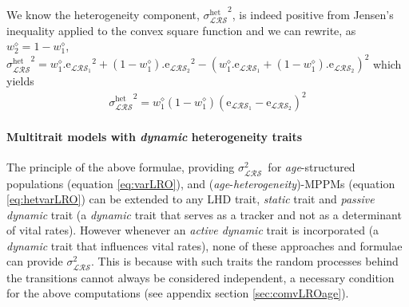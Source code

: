 \documentclass[10pt,a4paper]{article}
\newcommand{\vLRO}{$\sigma_{\mathrm{\mathcal{LRS}}}^2$}
\begin{document}
We know the heterogeneity component, ${\sigma_{\mathcal{LRS}}^{\mathrm{het}}}^{2}$, is indeed positive from Jensen's inequality applied to the convex square function and  we can rewrite, as $w^{\diamond}_{2}=1-w^{\diamond}_{1}$, 
$
{\sigma_{\mathcal{LRS}}^{\mathrm{het}}}^{2}= w^{\diamond}_{1}.\mathrm{e_{\mathcal{LRS}_1}}^2+(1-w^{\diamond}_{1}).\mathrm{e_{\mathcal{LRS}_2}}^2-(w^{\diamond}_{1}.\mathrm{e_{\mathcal{LRS}_1}}+(1-w^{\diamond}_{1}).\mathrm{e_{\mathcal{LRS}_2}})^2
$
which yields
\begin{eqnarray}
{\sigma_{\mathcal{LRS}}^{\mathrm{het}}}^{2}= w^{\diamond}_{1}(1-w^{\diamond}_{1})(\mathrm{e_{\mathcal{LRS}_1}}-\mathrm{e_{\mathcal{LRS}_2}})^2
\label{eq:hetvarLRO2}
 \end{eqnarray}

\paragraph{Multitrait models with \emph{dynamic} heterogeneity traits} 
\label{sec:vlrodynhet}
\label{sec:MCwR}

The principle of the above formulae, providing \vLRO\ for \emph{age}-structured populations  (equation \ref{eq:varLRO}), and (\emph{age}-\emph{heterogeneity})-MPPMs (equation \ref{eq:hetvarLRO}) can be extended to any LHD trait, \emph{static} trait and \emph{passive} \emph{dynamic}  trait (a \emph{dynamic} trait that serves as a tracker and not as a determinant of vital rates).%
However whenever an \emph{active dynamic} trait is incorporated (a \emph{dynamic} trait that influences vital rates), none of these approaches and formulae can provide \vLRO. This is because with such traits the random processes behind the transitions cannot always be considered independent, a necessary condition for the above computations (see appendix section \ref{sec:comvLROage}).\\
  
\end{document}
